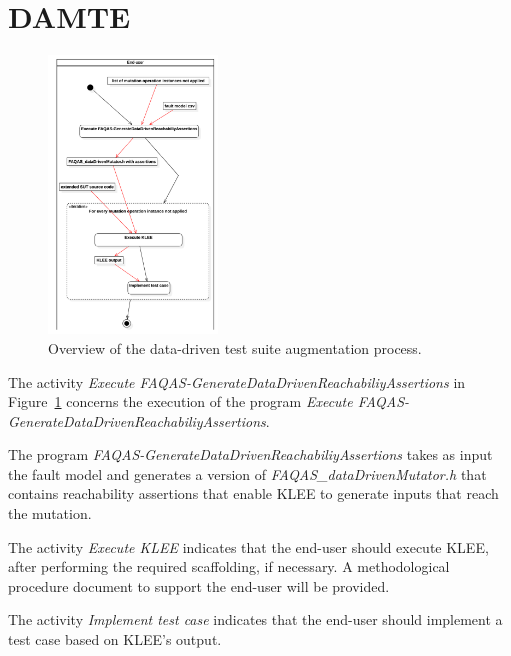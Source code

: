 

\section{DAMTE}

\begin{figure}[]
  \centering
	\includegraphics[width=0.4\textwidth]{images/png/Activity1!DataDrivenTestSuiteAugmentation_4.png}
      \caption{Overview of the data-driven test suite augmentation process.}
      \label{fig:process:dataDriven:augment}
\end{figure}

The activity \emph{Execute FAQAS-GenerateDataDrivenReachabiliyAssertions} in Figure~\ref{fig:process:dataDriven:augment} concerns the execution of the program \emph{Execute FAQAS-GenerateDataDrivenReachabiliyAssertions}.

The program \emph{FAQAS-GenerateDataDrivenReachabiliyAssertions} takes as input the fault model and generates a version of \emph{FAQAS\_dataDrivenMutator.h} that contains reachability assertions that enable KLEE to generate inputs that reach the mutation.

The activity \emph{Execute KLEE} indicates that the end-user should execute KLEE, after performing the required scaffolding, if necessary. A methodological procedure document to support the end-user will be provided.

The activity \emph{Implement test case} indicates that the end-user should implement a test case based on KLEE's output.

